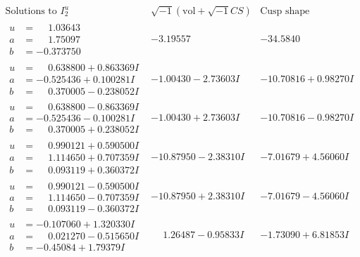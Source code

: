 \documentclass[1p]{elsarticle_modified}
\theoremstyle{definition}
\newcommand{\I}{\sqrt{-1}}
\begin{document}
$$\begin{array}{c|c|c}  
\text{Solutions to }I^u_{2}& \I (\text{vol} + \sqrt{-1}CS) & \text{Cusp shape}\\
 \hline 
\begin{aligned}
u &= \phantom{-}1.03643\phantom{ +0.000000I} \\
a &= \phantom{-}1.75097\phantom{ +0.000000I} \\
b &= -0.373750\phantom{ +0.000000I}\end{aligned}
 & -3.19557\phantom{ +0.000000I} & -34.5840\phantom{ +0.000000I} \\ \hline\begin{aligned}
u &= \phantom{-}0.638800 + 0.863369 I \\
a &= -0.525436 + 0.100281 I \\
b &= \phantom{-}0.370005 - 0.238052 I\end{aligned}
 & -1.00430 - 2.73603 I & -10.70816 + 0.98270 I \\ \hline\begin{aligned}
u &= \phantom{-}0.638800 - 0.863369 I \\
a &= -0.525436 - 0.100281 I \\
b &= \phantom{-}0.370005 + 0.238052 I\end{aligned}
 & -1.00430 + 2.73603 I & -10.70816 - 0.98270 I \\ \hline\begin{aligned}
u &= \phantom{-}0.990121 + 0.590500 I \\
a &= \phantom{-}1.114650 + 0.707359 I \\
b &= \phantom{-}0.093119 + 0.360372 I\end{aligned}
 & -10.87950 - 2.38310 I & -7.01679 + 4.56060 I \\ \hline\begin{aligned}
u &= \phantom{-}0.990121 - 0.590500 I \\
a &= \phantom{-}1.114650 - 0.707359 I \\
b &= \phantom{-}0.093119 - 0.360372 I\end{aligned}
 & -10.87950 + 2.38310 I & -7.01679 - 4.56060 I \\ \hline\begin{aligned}
u &= -0.107060 + 1.320330 I \\
a &= \phantom{-}0.021270 - 0.515650 I \\
b &= -0.45084 + 1.79379 I\end{aligned}
 & \phantom{-}1.26487 - 0.95833 I & -1.73090 + 6.81853 I \\ \hline\begin{aligned}

\end{aligned}
\end{array}$$
\end{document}
